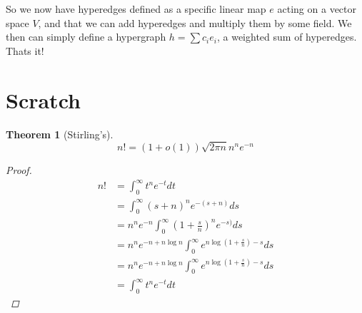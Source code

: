 \documentclass{article}
\newcommand{\parens}[1]{\left( #1 \right)}
\newtheorem{theorem}{Theorem}
\begin{document}
So we now have hyperedges defined as a specific linear map $e$ acting on a vector space $V$, and that we can add hyperedges and multiply them by some field. We then can simply define a hypergraph $h = \sum c_i e_i$, a weighted sum of hyperedges. Thats it! 


\section{Scratch}

\begin{theorem}[Stirling's]
    \begin{equation}
        n! = (1 + o(1)) \sqrt{2 \pi n} n^n e^{-n}
    \end{equation}
    \begin{proof}
    \begin{align}
        n! &= \int_0^\infty t^n e^{-t} dt \\
        &= \int_0^\infty (s+n)^{n} e^{-(s+n)} ds \\
        &= n^n e^{-n} \int_0^\infty \parens{ 1 + \frac{s}{n}}^{n} e^{-s)} ds \\
        &= n^n e^{-n + n \log n} \int_0^\infty e^{n \log \parens{1 + \frac{s}{n}} - s} ds \\
        &= n^n e^{-n + n \log n} \int_0^\infty e^{n \log \parens{1 + \frac{s}{n}} - s} ds \\
        &= \int_0^\infty t^n e^{-t} dt 
    \end{align}
\end{proof}
\end{theorem}
\end{document}
